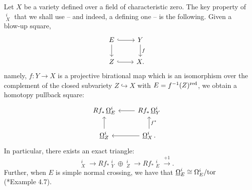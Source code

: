\documentclass[letterpaper,11pt]{amsart}
\DeclareMathOperator{\DDB}{\underline{\Omega}}
\theoremstyle{plain}
\theoremstyle{definition}
\theoremstyle{remark}
\begin{document}
Let  $X$ be a variety defined over a field of characteristic zero. The key property of $\DDB^i_X$ that we shall use -- and indeed, a defining one -- is the following. Given a blow-up square,
\begin{equation} \label{eq:blow-up-squareE}
\begin{tikzcd}
E \ar[hook]{r} \ar{d} & Y \ar{d}{f} \\
Z \ar[hook]{r} & X.
\end{tikzcd}
\end{equation}
namely, $f \colon Y \to X$ is a projective birational map which is an isomorphism over the complement of the closed subvariety $Z \hookrightarrow X$ with $E = f^{-1}(Z)^{\rm red}$, we obtain a homotopy pullback square: 
\begin{equation} \label{eq:HPS}
\begin{tikzcd}
Rf_*\DDB^{i}_{E}   & \ar{l} Rf_*\DDB^{i}_{Y}  \\
\DDB^{i}_{Z}  \ar{u} & \ar{l}  \ar{u}[swap]{f^*} \DDB^{i}_X.
\end{tikzcd}
\end{equation}
In particular, there exists an exact triangle:
\[
\DDB^{i}_X \to Rf_*\DDB^{i}_{Y} \oplus \DDB^{i}_{Z} \to  Rf_*\DDB^{i}_{E} \xrightarrow{+1}.
\]
Further, when $E$ is simple normal crossing, we have that $\DDB^i_E \cong \Omega^i_E/ {\rm tor}$ (\cite{DuBois}*{Example 4.7}). 
\end{document}
